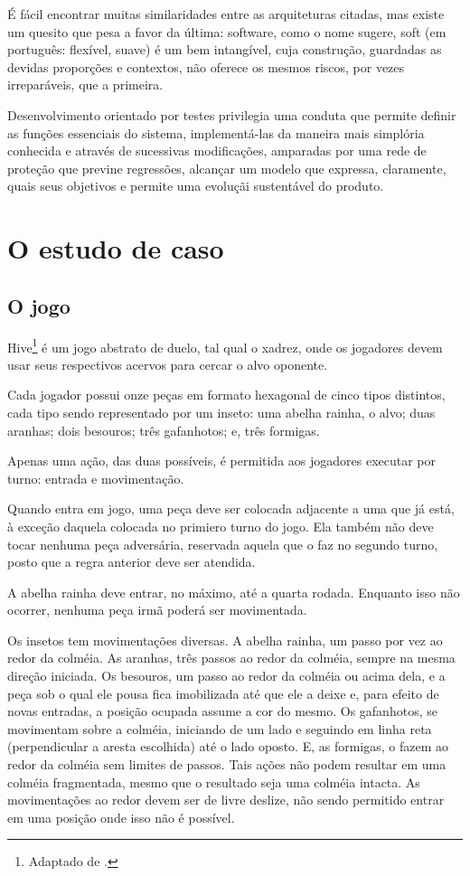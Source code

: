     É fácil encontrar muitas similaridades entre as arquiteturas citadas, mas existe um quesito que pesa a favor da última: software, como o nome sugere, soft (em português: flexível, suave) é um bem intangível, cuja construção, guardadas as devidas proporções e contextos, não oferece os mesmos riscos, por vezes irreparáveis, que a primeira.

    Desenvolvimento orientado por testes privilegia uma conduta que permite definir as funções essenciais do sistema, implementá-las da maneira mais simplória conhecida e através de sucessivas modificações, amparadas por uma rede de proteção que previne regressões, alcançar um modelo que expressa, claramente, quais seus objetivos e permite uma evoluçãi sustentável do produto.

  \section{O estudo de caso}

    \subsection{O jogo}

      Hive\footnote{Adaptado de \cite{UltraBoardGames2020}.} é um jogo abstrato de duelo, tal qual o xadrez, onde os jogadores devem usar seus respectivos acervos para cercar o alvo oponente.

      Cada jogador possui onze peças em formato hexagonal de cinco tipos distintos, cada tipo sendo representado por um inseto: uma abelha rainha, o alvo; duas aranhas; dois besouros; três gafanhotos; e, três formigas.

      Apenas uma ação, das duas possíveis, é permitida aos jogadores executar por turno: entrada e movimentação.

      Quando entra em jogo, uma peça deve ser colocada adjacente a uma que já está, à exceção daquela colocada no primiero turno do jogo. Ela também não deve tocar nenhuma peça adversária, reservada aquela que o faz no segundo turno, posto que a regra anterior deve ser atendida.

      A abelha rainha deve entrar, no máximo, até a quarta rodada. Enquanto isso não ocorrer, nenhuma peça irmã poderá ser movimentada.

      Os insetos tem movimentações diversas. A abelha rainha, um passo por vez ao redor da colméia. As aranhas, três passos ao redor da colméia, sempre na mesma direção iniciada. Os besouros, um passo ao redor da colméia ou acima dela, e a peça sob o qual ele pousa fica imobilizada até que ele a deixe e, para efeito de novas entradas, a posição ocupada assume a cor do mesmo. Os gafanhotos, se movimentam sobre a colméia, iniciando de um lado e seguindo em linha reta (perpendicular a aresta escolhida) até o lado oposto. E,  as formigas, o fazem ao redor da colméia sem limites de passos. Tais ações não podem resultar em uma colméia fragmentada, mesmo que o resultado seja uma colméia intacta. As movimentações ao redor devem ser de livre deslize, não sendo permitido entrar em uma posição onde isso não é possível.

